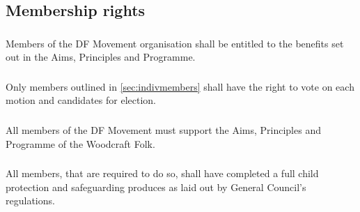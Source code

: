\documentclass[a4paper, 11pt]{report}
\begin{document}

\subsection{Membership rights}
\subsubsection{}
Members of the DF Movement organisation shall be entitled to the benefits set out in the Aims, Principles and Programme.
\subsubsection{}
Only members outlined in \ref{sec:indivmembers} shall have the right to vote on each motion and
candidates for election.
\subsubsection{}
All members of the DF Movement must support the Aims, Principles and Programme of the Woodcraft Folk.
\subsubsection{}
All members, that are required to do so, shall have completed a full child protection and safeguarding produces as laid out by General Council's regulations.
\end{document}
